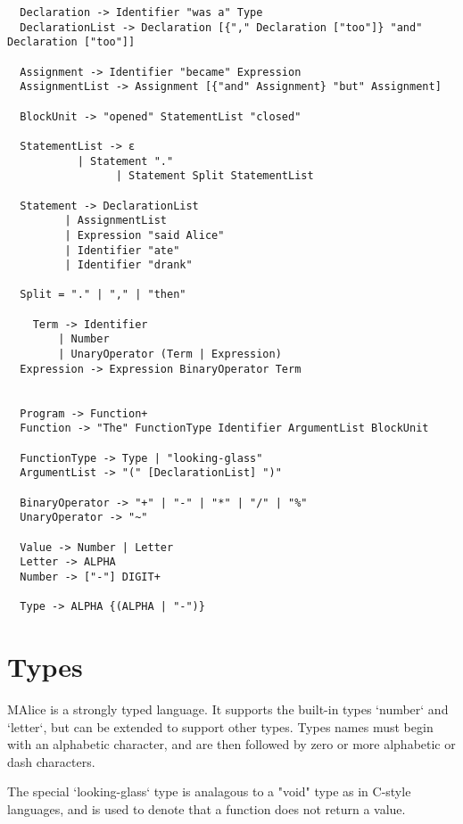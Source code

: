 \documentclass[a4wide, 11pt]{article}
\begin{document}
\begin{verbatim}
  Declaration -> Identifier "was a" Type
  DeclarationList -> Declaration [{"," Declaration ["too"]} "and" Declaration ["too"]]

  Assignment -> Identifier "became" Expression
  AssignmentList -> Assignment [{"and" Assignment} "but" Assignment]

  BlockUnit -> "opened" StatementList "closed"

  StatementList -> ε
           | Statement "."
                 | Statement Split StatementList
                 
  Statement -> DeclarationList
         | AssignmentList
         | Expression "said Alice"
         | Identifier "ate"
         | Identifier "drank"

  Split = "." | "," | "then"
 
    Term -> Identifier
        | Number
        | UnaryOperator (Term | Expression)
  Expression -> Expression BinaryOperator Term


  Program -> Function+
  Function -> "The" FunctionType Identifier ArgumentList BlockUnit

  FunctionType -> Type | "looking-glass"
  ArgumentList -> "(" [DeclarationList] ")"

  BinaryOperator -> "+" | "-" | "*" | "/" | "%"
  UnaryOperator -> "~" 

  Value -> Number | Letter
  Letter -> ALPHA
  Number -> ["-"] DIGIT+
  
  Type -> ALPHA {(ALPHA | "-")}

\end{verbatim}

\section{Types}

MAlice is a strongly typed language. It supports the built-in types `number` and `letter`, but can be extended to support other types. Types names must begin with an alphabetic character, and are then followed by zero or more alphabetic or dash characters.

The special `looking-glass` type is analagous to a "void" type as in C-style languages, and is used to denote that a function does not return a value.
\end{document}
